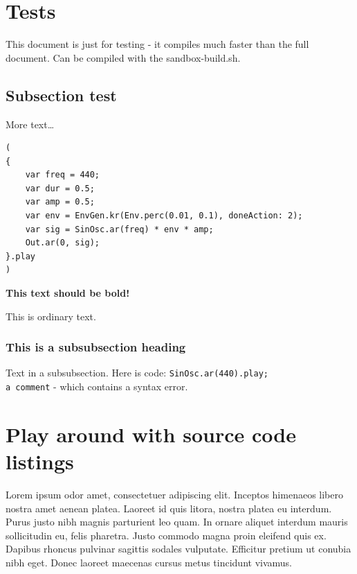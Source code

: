
\section{Tests}

This document is just for testing - it compiles much faster than the full document. Can be compiled with the sandbox-build.sh.

\subsection{Subsection test}

More text\dots

\begin{listing}
\begin{verbatim}
(
{
    var freq = 440;
    var dur = 0.5;
    var amp = 0.5;
    var env = EnvGen.kr(Env.perc(0.01, 0.1), doneAction: 2);
    var sig = SinOsc.ar(freq) * env * amp;
    Out.ar(0, sig);
}.play
)
\end{verbatim}
\caption{Some awesome code, using the standard lexer}
\end{listing}

\textbf{This text should be bold!}

This is ordinary text.

\subsubsection{This is a subsubsection heading}

Text in a subsubsection. Here is code: \texttt{SinOsc.ar(440).play; \\ a comment} - which contains a syntax error.

\section{Play around with source code listings}

Lorem ipsum odor amet, consectetuer adipiscing elit. Inceptos himenaeos libero nostra amet aenean platea. Laoreet id quis litora, nostra platea eu interdum. Purus justo nibh magnis parturient leo quam. In ornare aliquet interdum mauris sollicitudin eu, felis pharetra. Justo commodo magna proin eleifend quis ex. Dapibus rhoncus pulvinar sagittis sodales vulputate. Efficitur pretium ut conubia nibh eget. Donec laoreet maecenas cursus metus tincidunt vivamus.


